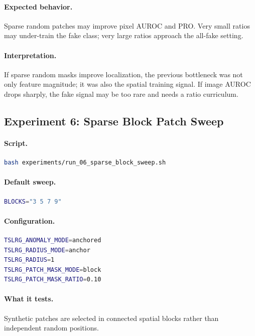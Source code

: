 \documentclass[11pt]{article}
\begin{document}
\paragraph{Expected behavior.}
Sparse random patches may improve pixel AUROC and PRO. Very small ratios may
under-train the fake class; very large ratios approach the all-fake setting.

\paragraph{Interpretation.}
If sparse random masks improve localization, the previous bottleneck was not
only feature magnitude; it was also the spatial training signal. If image AUROC
drops sharply, the fake signal may be too rare and needs a ratio curriculum.

\subsection{Experiment 6: Sparse Block Patch Sweep}

\paragraph{Script.}
\begin{lstlisting}[language=bash]
bash experiments/run_06_sparse_block_sweep.sh
\end{lstlisting}

\paragraph{Default sweep.}
\begin{lstlisting}[language=bash]
BLOCKS="3 5 7 9"
\end{lstlisting}

\paragraph{Configuration.}
\begin{lstlisting}[language=bash]
TSLRG_ANOMALY_MODE=anchored
TSLRG_RADIUS_MODE=anchor
TSLRG_RADIUS=1
TSLRG_PATCH_MASK_MODE=block
TSLRG_PATCH_MASK_RATIO=0.10
\end{lstlisting}

\paragraph{What it tests.}
Synthetic patches are selected in connected spatial blocks rather than
independent random positions.
\end{document}
